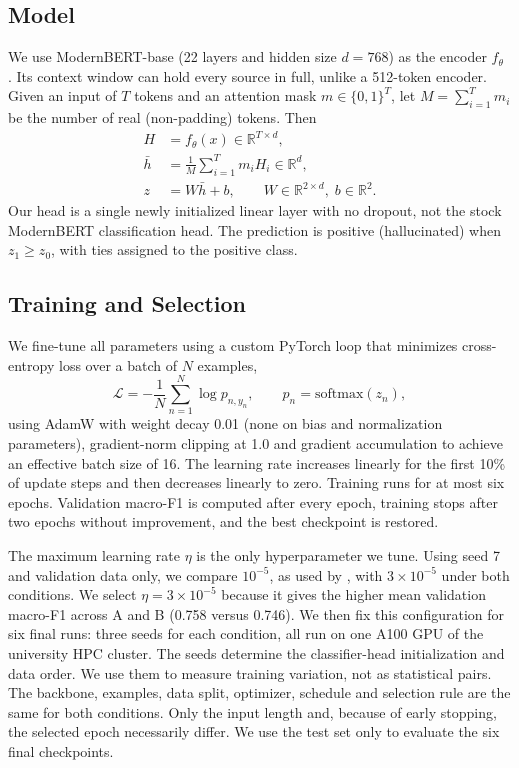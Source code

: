 \documentclass[conference]{IEEEtran}
\newcommand{\GridSeed}{7}    %
\newcommand{\GPU}{A100}         %
\begin{document}
\subsection{Model}
We use ModernBERT-base (22 layers and hidden size $d=768$) as the encoder
$f_\theta$ \cite{warner2024modernbert}. Its context window can hold every source
in full, unlike a 512-token encoder. Given an input of $T$ tokens and an
attention mask $m\in\{0,1\}^T$, let $M=\sum_{i=1}^{T} m_i$ be the number of real
(non-padding) tokens. Then
\begin{align}
H &= f_\theta(x) \in \mathbb{R}^{T\times d}, \label{eq:enc}\\
\bar{h} &= \frac{1}{M}\sum_{i=1}^{T} m_i H_i \in \mathbb{R}^{d}, \label{eq:pool}\\
z &= W\bar{h} + b, \qquad W\in\mathbb{R}^{2\times d},\; b\in\mathbb{R}^{2}. \label{eq:head}
\end{align}
Our head is a single newly initialized linear layer with no dropout,
not the stock ModernBERT classification head. The prediction is positive (hallucinated) when
$z_1 \ge z_0$, with ties assigned to the positive class.

\subsection{Training and Selection}
We fine-tune all parameters using a custom PyTorch loop that minimizes
cross-entropy loss over a batch of $N$ examples,
\begin{equation}
\mathcal{L} = -\frac{1}{N}\sum_{n=1}^{N} \log p_{n,y_n},
\qquad p_n = \mathrm{softmax}(z_n),
\label{eq:loss}
\end{equation}
using AdamW \cite{loshchilov2019adamw} with weight decay 0.01 (none on bias and
normalization parameters), gradient-norm clipping at 1.0 
and gradient accumulation to achieve an effective batch size of 16. 
The learning rate increases linearly for the first 10\% of update steps and
then decreases linearly to zero. Training runs for at most
six epochs. Validation macro-F1 is computed after every epoch, training stops
after two epochs without improvement, and the best checkpoint is restored.

The maximum learning rate $\eta$ is the only hyperparameter we tune. Using seed
\GridSeed{} and validation data only, we compare $10^{-5}$, as used by
\cite{kovacs2025lettucedetect}, with $3\times10^{-5}$ under both conditions. We
select $\eta=3\times10^{-5}$ because it gives the higher mean validation
macro-F1 across A and B (0.758 versus 0.746). We then fix this configuration for
six final runs: three seeds for each condition, all run on one \GPU{} GPU of the
university HPC cluster. The
seeds determine the classifier-head initialization and data order. 
We use them to measure training variation, not as statistical pairs.
The backbone, examples, data split, optimizer, schedule and selection rule are
the same for both conditions. Only the input length and, because of early
stopping, the selected epoch necessarily differ. We use the test set only to
evaluate the six final checkpoints.
\end{document}
